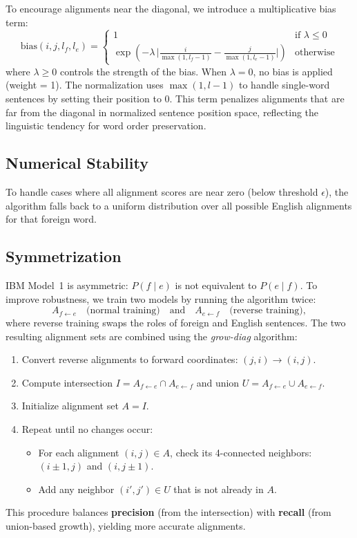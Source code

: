 \documentclass[11pt]{article}
\begin{document}
To encourage alignments near the diagonal, we introduce a multiplicative bias term:
\[
\text{bias}(i,j,l_f,l_e) = \begin{cases}
1 & \text{if } \lambda \le 0 \\
\exp\!\left(-\lambda \, \big|\tfrac{i}{\max(1, l_f-1)} - \tfrac{j}{\max(1, l_e-1)}\big|\right) & \text{otherwise}
\end{cases}
\]
where $\lambda \ge 0$ controls the strength of the bias. When $\lambda = 0$, no bias is applied (weight = 1). The normalization uses $\max(1, l-1)$ to handle single-word sentences by setting their position to 0. This term penalizes alignments that are far from the diagonal in normalized sentence position space, reflecting the linguistic tendency for word order preservation.

\subsection{Numerical Stability}

To handle cases where all alignment scores are near zero (below threshold $\epsilon$), the algorithm falls back to a uniform distribution over all possible English alignments for that foreign word.

\subsection{Symmetrization}

IBM Model~1 is asymmetric: $P(f \mid e)$ is not equivalent to $P(e \mid f)$.  
To improve robustness, we train two models by running the algorithm twice:
\[
A_{f \leftarrow e} \quad \text{(normal training)} \quad \text{and} \quad A_{e \leftarrow f} \quad \text{(reverse training)},
\]
where reverse training swaps the roles of foreign and English sentences. The two resulting alignment sets are combined using the \emph{grow-diag} algorithm:

\begin{enumerate}
    \item Convert reverse alignments to forward coordinates: $(j,i) \rightarrow (i,j)$.
    \item Compute intersection $I = A_{f \leftarrow e} \cap A_{e \leftarrow f}$ and union $U = A_{f \leftarrow e} \cup A_{e \leftarrow f}$.
    \item Initialize alignment set $A = I$.
    \item Repeat until no changes occur:
    \begin{itemize}
        \item For each alignment $(i,j) \in A$, check its 4-connected neighbors: $(i \pm 1, j)$ and $(i, j \pm 1)$.
        \item Add any neighbor $(i',j') \in U$ that is not already in $A$.
    \end{itemize}
\end{enumerate}

This procedure balances \textbf{precision} (from the intersection) with \textbf{recall} (from union-based growth), yielding more accurate alignments.
\end{document}
